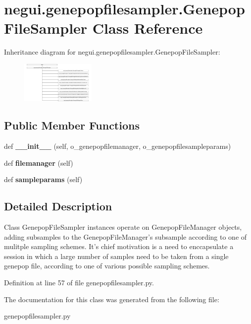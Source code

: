 \hypertarget{classnegui_1_1genepopfilesampler_1_1GenepopFileSampler}{}\section{negui.\+genepopfilesampler.\+Genepop\+File\+Sampler Class Reference}
\label{classnegui_1_1genepopfilesampler_1_1GenepopFileSampler}
Inheritance diagram for negui.\+genepopfilesampler.\+Genepop\+File\+Sampler\+:\begin{figure}[H]
\begin{center}
\leavevmode
\includegraphics[height=1.995250cm]{classnegui_1_1genepopfilesampler_1_1GenepopFileSampler}
\end{center}
\end{figure}
\subsection*{Public Member Functions}
\begin{DoxyCompactItemize}
\item 
def {\bfseries \+\_\+\+\_\+init\+\_\+\+\_\+} (self, o\+\_\+genepopfilemanager, o\+\_\+genepopfilesampleparams)\hypertarget{classnegui_1_1genepopfilesampler_1_1GenepopFileSampler_abcaee019cd11b009568dde7fa2e94341}{}\label{classnegui_1_1genepopfilesampler_1_1GenepopFileSampler_abcaee019cd11b009568dde7fa2e94341}

\item 
def {\bfseries filemanager} (self)\hypertarget{classnegui_1_1genepopfilesampler_1_1GenepopFileSampler_a58431ed64951ef4a3cf813c9ee2624b3}{}\label{classnegui_1_1genepopfilesampler_1_1GenepopFileSampler_a58431ed64951ef4a3cf813c9ee2624b3}

\item 
def {\bfseries sampleparams} (self)\hypertarget{classnegui_1_1genepopfilesampler_1_1GenepopFileSampler_ad48f60ff378a777538a886b058eb0e00}{}\label{classnegui_1_1genepopfilesampler_1_1GenepopFileSampler_ad48f60ff378a777538a886b058eb0e00}

\end{DoxyCompactItemize}


\subsection{Detailed Description}
\begin{DoxyVerb}Class GenepopFileSampler instances operate on GenepopFileManager objects,
adding subsamples to the GenepopFileManager's subsample according to one of
mulitple sampling schemes.  It's chief motivation is a need to enccapsulate 
a session in which a large number of samples need to be taken from a single
genepop file, according to one of various possible sampling schemes.
\end{DoxyVerb}
 

Definition at line 57 of file genepopfilesampler.\+py.



The documentation for this class was generated from the following file\+:\begin{DoxyCompactItemize}
\item 
genepopfilesampler.\+py\end{DoxyCompactItemize}
